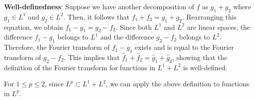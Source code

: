\textbf{Well-definedness}: Suppose we have another decomposition of $f$ as $g_1 + g_2$ where $g_1 \in L^1$ and $g_2 \in L^2$. Then, it follows that $f_1 + f_2 = g_1 + g_2$. Rearranging this equation, we obtain $f_1 - g_1 = g_2 - f_2$. Since both $L^1$ and $L^2$ are linear spaces, the difference $f_1 - g_1$ belongs to $L^1$ and the difference $g_2 - f_2$ belongs to $L^2$. Therefore, the Fourier transform of $f_1 - g_1$ exists and is equal to the Fourier transform of $g_2 - f_2$. This implies that $\hat{f}_1 + \hat{f}_2 = \hat{g}_1 + \hat{g}_2$, showing that the definition of the Fourier transform for functions in $L^1 + L^2$ is well-defined.

\begin{definition}
    For $1 \leq p \leq 2$, since $L^p \subset L^1 + L^2$, we can apply the above definition to functions in $L^p$.
\end{definition}